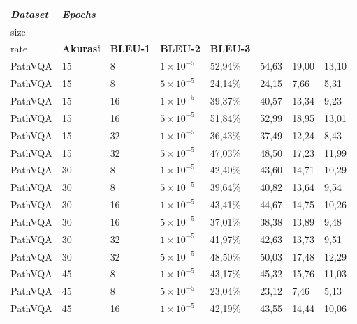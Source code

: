 \begin{longtable}[c]{|l|l|l|l|l|l|l|l|}
    \hline
    \textit{\textbf{Dataset}} &
      \textit{\textbf{Epochs}} &
      \textit{\textbf{\begin{tabular}[c]{@{}l@{}}Batch \\ size\end{tabular}}} &
      \textit{\textbf{\begin{tabular}[c]{@{}l@{}}Learning \\ rate\end{tabular}}} &
      \textbf{Akurasi} &
      \textbf{BLEU-1} &
      \textbf{BLEU-2} &
      \textbf{BLEU-3} \\ \hline
    \endfirsthead
    \endhead

    PathVQA & 15 & 8  & $1 \times 10^{-5}$ & 52,94\% & 54,63 & 19,00 & 13,10 \\ \hline
    PathVQA & 15 & 8  & $5 \times 10^{-5}$ & 24,14\% & 24,15 & 7,66  & 5,31  \\ \hline
    PathVQA & 15 & 16 & $1 \times 10^{-5}$ & 39,37\% & 40,57 & 13,34 & 9,23  \\ \hline
    PathVQA & 15 & 16 & $5 \times 10^{-5}$ & 51,84\% & 52,99 & 18,95 & 13,01 \\ \hline
    PathVQA & 15 & 32 & $1 \times 10^{-5}$ & 36,43\% & 37,49 & 12,24 & 8,43  \\ \hline
    PathVQA & 15 & 32 & $5 \times 10^{-5}$ & 47,03\% & 48,50 & 17,23 & 11,99 \\ \hline
    PathVQA & 30 & 8  & $1 \times 10^{-5}$ & 42,40\% & 43,60 & 14,71 & 10,29 \\ \hline
    PathVQA & 30 & 8  & $5 \times 10^{-5}$ & 39,64\% & 40,82 & 13,64 & 9,54  \\ \hline
    PathVQA & 30 & 16 & $1 \times 10^{-5}$ & 43,41\% & 44,67 & 14,75 & 10,26 \\ \hline
    PathVQA & 30 & 16 & $5 \times 10^{-5}$ & 37,01\% & 38,38 & 13,89 & 9,48  \\ \hline
    PathVQA & 30 & 32 & $1 \times 10^{-5}$ & 41,97\% & 42,63 & 13,73 & 9,51  \\ \hline
    PathVQA & 30 & 32 & $5 \times 10^{-5}$ & 48,50\% & 50,03 & 17,48 & 12,29 \\ \hline
    PathVQA & 45 & 8  & $1 \times 10^{-5}$ & 43,17\% & 45,32 & 15,76 & 11,03 \\ \hline
    PathVQA & 45 & 8  & $5 \times 10^{-5}$ & 23,04\% & 23,12 & 7,46  & 5,13  \\ \hline
    PathVQA & 45 & 16 & $1 \times 10^{-5}$ & 42,19\% & 43,55 & 14,44 & 10,06 \\ \hline

\end{longtable}
